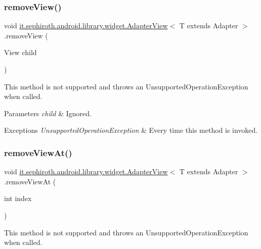 \subsubsection{\texorpdfstring{remove\+View()}{removeView()}}
{\footnotesize\ttfamily void \hyperlink{classit_1_1sephiroth_1_1android_1_1library_1_1widget_1_1_adapter_view}{it.\+sephiroth.\+android.\+library.\+widget.\+Adapter\+View}$<$ T extends Adapter $>$.remove\+View (\begin{DoxyParamCaption}\item[{View}]{child }\end{DoxyParamCaption})}

This method is not supported and throws an Unsupported\+Operation\+Exception when called.


\begin{DoxyParams}{Parameters}
{\em child} & Ignored.\\
\hline
\end{DoxyParams}

\begin{DoxyExceptions}{Exceptions}
{\em Unsupported\+Operation\+Exception} & Every time this method is invoked. \\
\hline
\end{DoxyExceptions}
\mbox{\label{classit_1_1sephiroth_1_1android_1_1library_1_1widget_1_1_adapter_view_addce723da9788dd4532b9b3a7135fe62}} 
\subsubsection{\texorpdfstring{remove\+View\+At()}{removeViewAt()}}
{\footnotesize\ttfamily void \hyperlink{classit_1_1sephiroth_1_1android_1_1library_1_1widget_1_1_adapter_view}{it.\+sephiroth.\+android.\+library.\+widget.\+Adapter\+View}$<$ T extends Adapter $>$.remove\+View\+At (\begin{DoxyParamCaption}\item[{int}]{index }\end{DoxyParamCaption})}

This method is not supported and throws an Unsupported\+Operation\+Exception when called.


